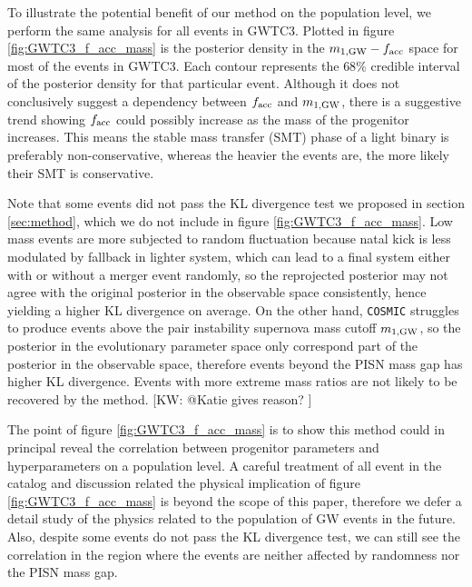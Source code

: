 \documentclass[twocolumn]{aastex631}
\newcommand{\kw}[1]{{\color{rb4}[KW: #1 ]}}
\begin{document}
To illustrate the potential benefit of our method on the population level, we perform the same analysis for all events in GWTC3.
Plotted in figure \ref{fig:GWTC3_f_acc_mass} is the posterior density in the $m_{1,{\rm GW}}-f_{\rm acc}$ space for most of the events in GWTC3.
Each contour represents the $68\%$ credible interval of the posterior density for that particular event.
Although it does not conclusively suggest a dependency between $f_{\rm acc}$ and $m_{1,{\rm GW}}$,
there is a suggestive trend showing $f_{\rm acc}$ could possibly increase as the mass of the progenitor increases.
This means the stable mass transfer (SMT) phase of a light binary is preferably non-conservative, whereas the heavier the events are, the more likely their SMT is conservative.

Note that some events did not pass the KL divergence test we proposed in section \ref{sec:method}, which we do not include in figure \ref{fig:GWTC3_f_acc_mass}.
Low mass events are more subjected to random fluctuation because natal kick is less modulated by fallback in lighter system,
which can lead to a final system either with or without a merger event randomly,
so the reprojected posterior may not agree with the original posterior in the observable space consistently, hence yielding a higher KL divergence on average.
On the other hand, \texttt{COSMIC} struggles to produce events above the pair instability supernova mass cutoff $m_{1,{\rm GW}}$,
so the posterior in the evolutionary parameter space only correspond part of the posterior in the observable space, therefore events beyond the PISN mass gap has higher KL divergence.
Events with more extreme mass ratios are not likely to be recovered by the method. \kw{@Katie gives reason?}

The point of figure \ref{fig:GWTC3_f_acc_mass} is to show this method could in principal reveal the correlation between progenitor parameters and hyperparameters on a population level.
A careful treatment of all event in the catalog and discussion related the physical implication of figure \ref{fig:GWTC3_f_acc_mass} is beyond the scope of this paper,
therefore we defer a detail study of the physics related to the population of GW events in the future.
Also, despite some events do not pass the KL divergence test, we can still see the correlation in the region where the events are neither affected by randomness nor the PISN mass gap.
\end{document}
